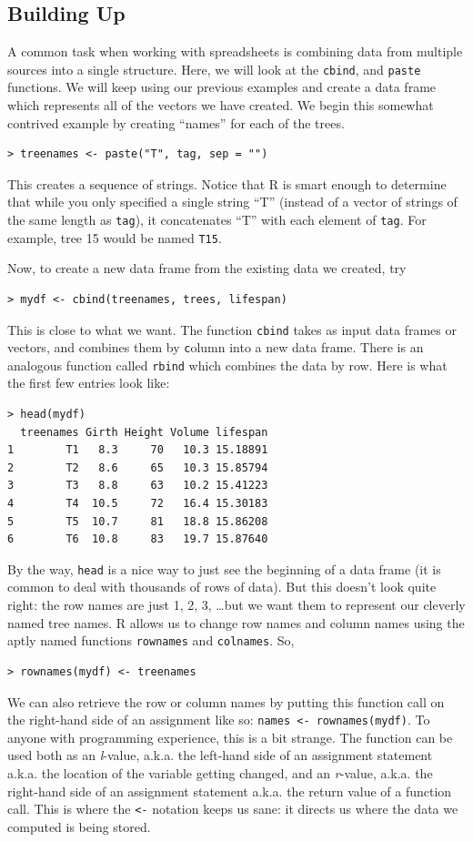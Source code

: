 \documentclass[12pt]{article}
\theoremstyle{remark}
\begin{document}
\subsection{Building Up}
A common task when working with spreadsheets is combining data from multiple sources into a single structure. Here, we will look at the \verb|cbind|, and \verb|paste| functions. We will keep using our previous examples and create a data frame which represents all of the vectors we have created. We begin this somewhat contrived example by creating ``names'' for each of the trees.

\begin{verbatim}
> treenames <- paste("T", tag, sep = "")
\end{verbatim}

This creates a sequence of strings. Notice that R is smart enough to determine that while you only specified a single string ``T'' (instead of a vector of strings of the same length as \verb|tag|), it concatenates ``T'' with each element of \verb|tag|. For example, tree 15 would be named \verb|T15|.

Now, to create a new data frame from the existing data we created, try
\begin{verbatim}
> mydf <- cbind(treenames, trees, lifespan)
\end{verbatim}
This is close to what we want. The function \verb|cbind| takes as input data frames or vectors, and combines them by \verb|c|olumn into a new data frame. There is an analogous function called \verb|rbind| which combines the data by row. Here is what the first few entries look like:

\begin{Verbatim}[frame=single, fontsize=\small]
> head(mydf)
  treenames Girth Height Volume lifespan
1        T1   8.3     70   10.3 15.18891
2        T2   8.6     65   10.3 15.85794
3        T3   8.8     63   10.2 15.41223
4        T4  10.5     72   16.4 15.30183
5        T5  10.7     81   18.8 15.86208
6        T6  10.8     83   19.7 15.87640
\end{Verbatim}
By the way, \verb|head| is a nice way to just see the beginning of a data frame (it is common to deal with thousands of rows of data). But this doesn't look quite right: the row names are just 1, 2, 3, \dots but we want them to represent our cleverly named tree names. R allows us to change row names and column names using the aptly named functions \verb|rownames| and \verb|colnames|. So,
\begin{verbatim}
> rownames(mydf) <- treenames
\end{verbatim}
We can also retrieve the row or column names by putting this function call on the right-hand side of an assignment like so: \verb|names <- rownames(mydf)|. To anyone with programming experience, this is a bit strange. The function can be used both as an \emph{l}-value, a.k.a. the left-hand side of an assignment statement a.k.a. the location of the variable getting changed, and an \emph{r}-value, a.k.a. the right-hand side of an assignment statement a.k.a. the return value of a function call. This is where the \verb|<-| notation keeps us sane: it directs us where the data we computed is being stored.
\end{document}
